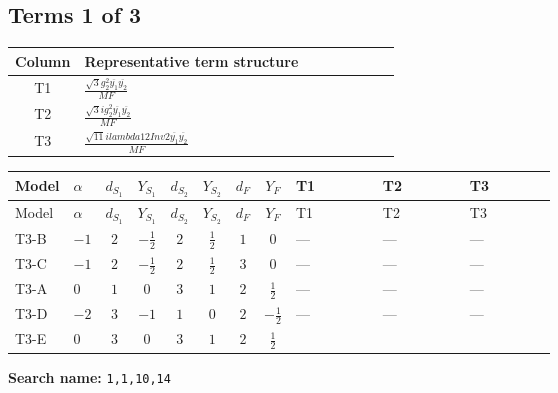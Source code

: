 \documentclass[8pt]{article}
\begin{document}
\begin{landscape}
\subsection*{Terms 1 of 3}
\begin{center}
\begin{tabular}{@{}c >{\raggedright\arraybackslash}p{0.82\linewidth}@{}}
\toprule
Column & Representative term structure \\
\midrule
T1 & \(\displaystyle \frac{\sqrt{3} g_{2}^{2} \overline{y_{1}} \overline{y_{2}}}{MF}\) \\
\midrule
T2 & \(\displaystyle \frac{\sqrt{3} i g_{2}^{2} \overline{y_{1}} \overline{y_{2}}}{MF}\) \\
\midrule
T3 & \(\displaystyle \frac{\sqrt{11} i lambda12Inv2 \overline{y_{1}} \overline{y_{2}}}{MF}\) \\
\midrule
\bottomrule
\end{tabular}
\end{center}
\smallskip
\tiny
\begin{longtable}{@{}llcccccc >{\raggedright\arraybackslash}p{0.21\linewidth} >{\raggedright\arraybackslash}p{0.21\linewidth} >{\raggedright\arraybackslash}p{0.21\linewidth}@{}}
\toprule
Model & $\alpha$ & $d_{S_1}$ & $Y_{S_1}$ & $d_{S_2}$ & $Y_{S_2}$ & $d_F$ & $Y_F$ & T1 & T2 & T3 \\
\midrule
\endfirsthead
\toprule
Model & $\alpha$ & $d_{S_1}$ & $Y_{S_1}$ & $d_{S_2}$ & $Y_{S_2}$ & $d_F$ & $Y_F$ & T1 & T2 & T3 \\
\midrule
\endhead
T3-B & $-1$ & $2$ & $-\frac{1}{2}$ & $2$ & $\frac{1}{2}$ & $1$ & $0$ & --- & --- & --- \\
\midrule
T3-C & $-1$ & $2$ & $-\frac{1}{2}$ & $2$ & $\frac{1}{2}$ & $3$ & $0$ & --- & --- & --- \\
\midrule
T3-A & $0$ & $1$ & $0$ & $3$ & $1$ & $2$ & $\frac{1}{2}$ & --- & --- & --- \\
\midrule
T3-D & $-2$ & $3$ & $-1$ & $1$ & $0$ & $2$ & $-\frac{1}{2}$ & --- & --- & --- \\
\midrule
T3-E & $0$ & $3$ & $0$ & $3$ & $1$ & $2$ & $\frac{1}{2}$ & \scriptsize\adjustbox{max width=\linewidth}{$\begin{gathered} - \frac{\sqrt{3} g_{2}^{2} \overline{y_{1}} \overline{y_{2}}}{6 MF}\end{gathered}$} & \scriptsize\adjustbox{max width=\linewidth}{$\begin{gathered} - \frac{49 \sqrt{3} i g_{2}^{2} \overline{y_{1}} \overline{y_{2}}}{24 MF}\end{gathered}$} & \scriptsize\adjustbox{max width=\linewidth}{$\begin{gathered} - \frac{3 \sqrt{11} i lambda12Inv2 \overline{y_{1}} \overline{y_{2}}}{22 MF}\end{gathered}$} \\
\midrule
\bottomrule
\end{longtable}
\clearpage
\noindent\textbf{Search name: }\texttt{1,1,10,14}\par\smallskip

\end{landscape}
\end{document}
